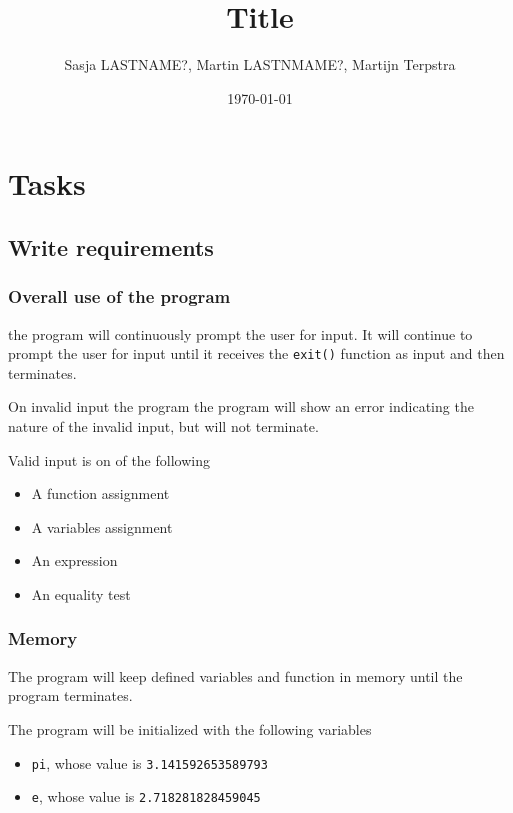 \documentclass[11pt,a4paper]{article}
\author{Sasja LASTNAME?, Martin LASTNMAME?, Martijn Terpstra}
\date{\today}
\title{Title}
\begin{document}
\maketitle
\tableofcontents




\section{Tasks}
\label{sec:orgheadline16}
\subsection{Write requirements}
\label{sec:orgheadline8}
\subsubsection{Overall use of the program}
\label{sec:orgheadline1}
the program will continuously prompt the user for input. It will
continue to prompt the user for input until it receives the
\texttt{exit()} function as input and then terminates.

On invalid input the program the program will show an error
indicating the nature of the invalid input, but will not terminate.

Valid input is on of the following
\begin{itemize}
\item A function assignment
\item A variables assignment
\item An expression
\item An equality test
\end{itemize}
\subsubsection{Memory}
\label{sec:orgheadline2}
The program will keep defined variables and function in memory
until the program terminates.


The program will be initialized with the following variables
\begin{itemize}
\item \texttt{pi}, whose value is \texttt{3.141592653589793}
\item \texttt{e}, whose value is \texttt{2.718281828459045}
\end{itemize}
\end{document}

